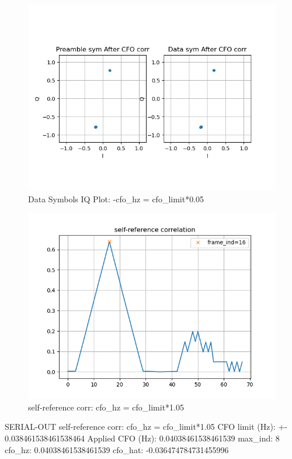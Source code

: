 \documentclass[
	letterpaper, %
	10pt, %
]{CSUniSchoolLabReport}
\begin{document}
\begin{figure}[H] %
	\centering %
	\includegraphics[width=1.2\textwidth]{assignment1f.png} %
	\caption{Data Symbols IQ Plot: -cfo\_hz = cfo\_limit*0.05}
	\label{fig:block}
\end{figure}

\begin{figure}[H] %
	\centering %
	\includegraphics[width=1.2\textwidth]{assignment1g.png} %
	\caption{self-reference corr: cfo\_hz = cfo\_limit*1.05}
	\label{fig:block}
\end{figure}
SERIAL-OUT self-reference corr: cfo\_hz = cfo\_limit*1.05\newline
CFO limit (Hz): +-  0.038461538461538464\newline
Applied CFO (Hz):  0.04038461538461539\newline
max\_ind:  8\newline
cfo\_hz:  0.04038461538461539\newline
cfo\_hat:  -0.036474784731455996\newline
\end{document}
